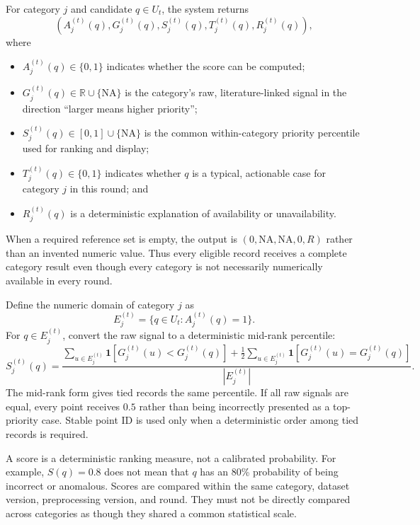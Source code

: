 \documentclass[11pt]{article}
\newcommand{\NA}{\mathrm{NA}}
\begin{document}
For category $j$ and candidate $q\in U_t$, the system returns
\begin{equation}
    \left(
        A_j^{(t)}(q),
        G_j^{(t)}(q),
        S_j^{(t)}(q),
        T_j^{(t)}(q),
        R_j^{(t)}(q)
    \right),
\end{equation}
where
\begin{itemize}[leftmargin=*]
    \item $A_j^{(t)}(q)\in\{0,1\}$ indicates whether the score can be computed;
    \item $G_j^{(t)}(q)\in\mathbb{R}\cup\{\NA\}$ is the category's raw,
    literature-linked signal in the direction ``larger means higher priority'';
    \item $S_j^{(t)}(q)\in[0,1]\cup\{\NA\}$ is the common within-category
    priority percentile used for ranking and display;
    \item $T_j^{(t)}(q)\in\{0,1\}$ indicates whether $q$ is a typical,
    actionable case for category $j$ in this round; and
    \item $R_j^{(t)}(q)$ is a deterministic explanation of availability or
    unavailability.
\end{itemize}

When a required reference set is empty, the output is
$(0,\NA,\NA,0,R)$ rather than an invented numeric value. Thus every eligible
record receives a complete category result even though every category is not
necessarily numerically available in every round.

Define the numeric domain of category $j$ as
\begin{equation}
    E_j^{(t)}
    =
    \{q\in U_t:A_j^{(t)}(q)=1\}.
\end{equation}
For $q\in E_j^{(t)}$, convert the raw signal to a deterministic mid-rank
percentile:
\begin{equation}
    \boxed{
    S_j^{(t)}(q)
    =
    \frac{
        \sum_{u\in E_j^{(t)}}
        \mathbf{1}[G_j^{(t)}(u)<G_j^{(t)}(q)]
        +
        \frac{1}{2}
        \sum_{u\in E_j^{(t)}}
        \mathbf{1}[G_j^{(t)}(u)=G_j^{(t)}(q)]
    }{|E_j^{(t)}|}
    }.
\end{equation}
The mid-rank form gives tied records the same percentile. If all raw signals are
equal, every point receives $0.5$ rather than being incorrectly presented as a
top-priority case. Stable point ID is used only when a deterministic order among
tied records is required.

A score is a deterministic ranking measure, not a calibrated probability. For
example, $S(q)=0.8$ does not mean that $q$ has an 80\% probability of being
incorrect or anomalous. Scores are compared within the same category, dataset
version, preprocessing version, and round. They must not be directly compared
across categories as though they shared a common statistical scale.
\end{document}
